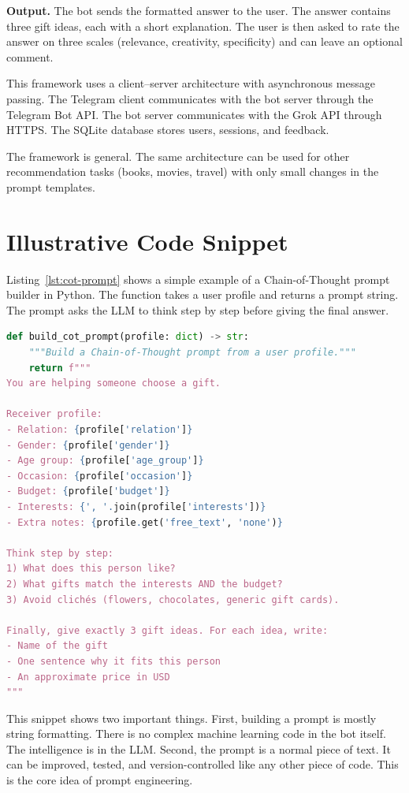 \textbf{Output.} The bot sends the formatted answer to the user. The answer contains three gift ideas, each with a short explanation. The user is then asked to rate the answer on three scales (relevance, creativity, specificity) and can leave an optional comment.

This framework uses a client--server architecture with asynchronous message passing. The Telegram client communicates with the bot server through the Telegram Bot API. The bot server communicates with the Grok API through HTTPS. The SQLite database stores users, sessions, and feedback.

The framework is general. The same architecture can be used for other recommendation tasks (books, movies, travel) with only small changes in the prompt templates.

\section{Illustrative Code Snippet}
\label{sec:code-snippet}

Listing~\ref{lst:cot-prompt} shows a simple example of a Chain-of-Thought prompt builder in Python. The function takes a user profile and returns a prompt string. The prompt asks the LLM to think step by step before giving the final answer.

\begin{lstlisting}[language=Python, caption={Example of a Chain-of-Thought prompt builder.}, label={lst:cot-prompt}]
def build_cot_prompt(profile: dict) -> str:
    """Build a Chain-of-Thought prompt from a user profile."""
    return f"""
You are helping someone choose a gift.

Receiver profile:
- Relation: {profile['relation']}
- Gender: {profile['gender']}
- Age group: {profile['age_group']}
- Occasion: {profile['occasion']}
- Budget: {profile['budget']}
- Interests: {', '.join(profile['interests'])}
- Extra notes: {profile.get('free_text', 'none')}

Think step by step:
1) What does this person like?
2) What gifts match the interests AND the budget?
3) Avoid clichés (flowers, chocolates, generic gift cards).

Finally, give exactly 3 gift ideas. For each idea, write:
- Name of the gift
- One sentence why it fits this person
- An approximate price in USD
"""
\end{lstlisting}

This snippet shows two important things. First, building a prompt is mostly string formatting. There is no complex machine learning code in the bot itself. The intelligence is in the LLM. Second, the prompt is a normal piece of text. It can be improved, tested, and version-controlled like any other piece of code. This is the core idea of prompt engineering.

